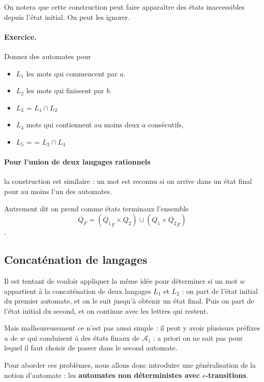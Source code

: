 \documentclass[10pt,twoside]{article}
\begin{document}
On notera que cette construction peut faire apparaître des états inaccessibles
depuis l'état initial. On peut les ignorer.

\paragraph{Exercice.} Donnez des automates pour 
\begin{itemize} 

\item $L_1$  les mots qui commencent par $a$.
\item $L_2$  les mots qui finissent par $b$.
\item $L_3$ = $L_1 \cap L_2$
\item $L_4$ mots qui  contiennent au moins deux $a$ consécutifs,
\item $L_5$ = = $L_3 \cap L_4$
\end{itemize}

\paragraph{Pour l'\textbf{union} de deux
langages rationnels} la construction est similaire : un mot est
reconnu si on arrive dans un état final pour au moins l'un des
automates.

Autrement dit on prend comme états terminaux l'ensemble
$$Q_F = ({Q_1}_F \times Q_2)  \cup  (Q_1 \times {Q_2}_F)$$.


\subsection{Concaténation de langages}

Il est  tentant de vouloir appliquer la même idée pour déterminer
si un mot $w$ appartient à la concaténation de deux langages $L_1$ et $L_2$ :
on part de l'état initial du premier automate, et on le suit jusqu'à obtenir un
état final. Puis on part de l'état initial du second, et on continue avec les lettres qui restent.

Mais malheureusement ce n'est pas aussi simple : il peut y avoir 
plusieurs préfixes $u$ de $w$ qui conduisent à des états finaux de $\mathcal{A}_1$ : a priori 
on ne sait pas pour lequel il faut choisir de passer dans le second automate.

Pour aborder ces problèmes, nous allons donc introduire une généralisation de la notion d'automate
: les \textbf{automates non déterministes avec $\epsilon$-transitions}.
\end{document}
